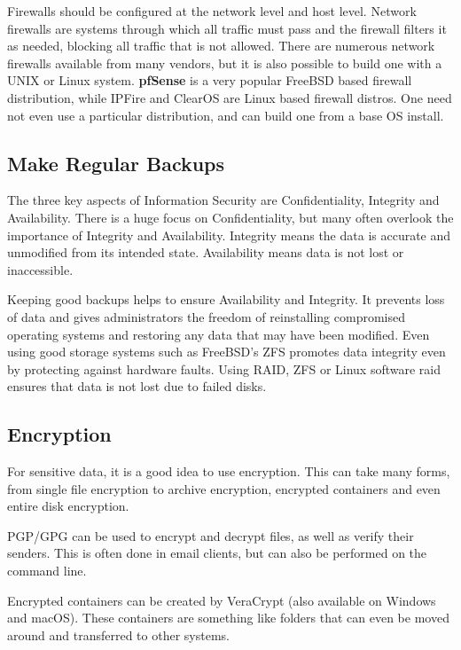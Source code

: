 Firewalls should be configured at the network level and host level.  Network firewalls are systems through which all traffic must pass and the firewall filters it as needed, blocking all traffic that is not allowed.  There are numerous network firewalls available from many vendors, but it is also possible to build one with a UNIX or Linux system.  \textbf{pfSense} is a very popular FreeBSD based firewall distribution, while IPFire and ClearOS are Linux based firewall distros. One need not even use a particular distribution, and can build one from a base OS install.

\subsection{Make Regular Backups}

The three key aspects of Information Security are Confidentiality, Integrity and Availability. There is a huge focus on Confidentiality, but many often overlook the importance of Integrity and Availability.  Integrity means the data is accurate and unmodified from its intended state.  Availability means data is not lost or inaccessible.  

Keeping good backups helps to ensure Availability and Integrity.  It prevents loss of data and gives administrators the freedom of reinstalling compromised operating systems and restoring any data that may have been modified. Even using good storage systems such as FreeBSD's ZFS promotes data integrity even by protecting against hardware faults.  Using RAID, ZFS or Linux software raid ensures that data is not lost due to failed disks.

\subsection{Encryption}

For sensitive data, it is a good idea to use encryption. This can take many forms, from single file encryption to archive encryption, encrypted containers and even entire disk encryption.

PGP/GPG can be used to encrypt and decrypt files, as well as verify their senders. This is often done in email clients, but can also be performed on the command line.

Encrypted containers can be created by VeraCrypt (also available on Windows and macOS). These containers are something like folders that can even be moved around and transferred to other systems.

